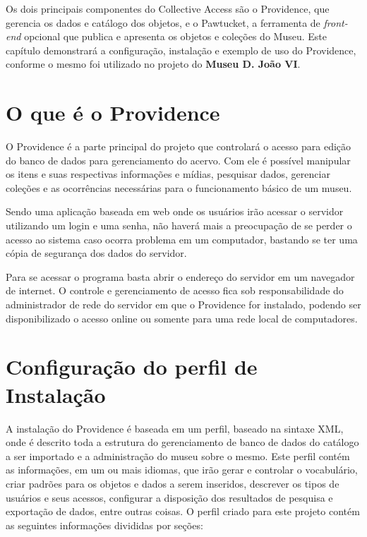 \documentclass[a4paper,12pt,oneside,onecolumn,final,fleqn]{repUERJ}
\begin{document}
Os dois principais componentes do Collective Access são o Providence, que gerencia os dados e catálogo dos objetos, e o Pawtucket, a ferramenta de \textit{front-end} opcional que publica e apresenta os objetos e coleções do Museu. Este capítulo demonstrará a configuração, instalação e exemplo de uso do Providence, conforme o mesmo foi utilizado no projeto do \textbf{Museu D. João VI}.

\section{O que é o Providence}

O Providence é a parte principal do projeto que controlará o acesso para edição do banco de dados para gerenciamento do acervo. Com ele é possível manipular os itens e suas respectivas informações e mídias, pesquisar dados, gerenciar coleções e as ocorrências necessárias para o funcionamento básico de um museu.

Sendo uma aplicação baseada em web onde os usuários irão acessar o servidor utilizando um login e uma senha, não haverá mais a preocupação de se perder o acesso ao sistema caso ocorra problema em um computador, bastando se ter uma cópia de segurança dos dados do servidor.

Para se acessar o programa basta abrir o endereço do servidor em um navegador de internet. O controle e gerenciamento de acesso fica sob responsabilidade do administrador de rede do servidor em que o Providence for instalado, podendo ser disponibilizado o acesso online ou somente para uma rede local de computadores.

\section{Configuração do perfil de Instalação}

A instalação do Providence é baseada em um perfil, baseado na sintaxe XML, onde é descrito toda a estrutura do gerenciamento de banco de dados do catálogo a ser importado e a administração do museu sobre o mesmo. Este perfil contém as informações, em um ou mais idiomas, que irão gerar e controlar o vocabulário,  criar padrões para os objetos e dados a serem inseridos, descrever os tipos de usuários e seus acessos, configurar a disposição dos resultados de pesquisa e exportação de dados, entre outras coisas. O perfil criado para este projeto contém as seguintes informações divididas por seções: 
\end{document}
